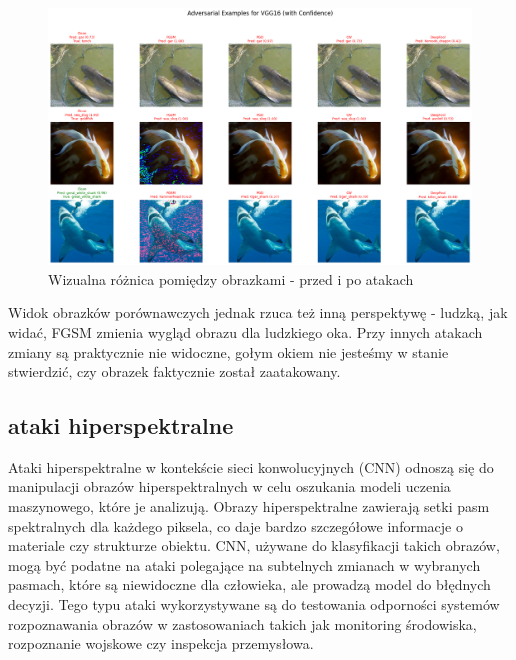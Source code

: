 \documentclass{article}
\begin{document}
\begin{figure} [H]
    \centering
    \includegraphics[width=1\textwidth]{adversarial_examples.png}
    \caption{Wizualna różnica pomiędzy obrazkami - przed i po atakach}
    \label{fig:enter-label}
\end{figure}

Widok obrazków porównawczych jednak rzuca też inną perspektywę - ludzką, jak widać, FGSM zmienia wygląd obrazu dla ludzkiego oka. Przy innych atakach zmiany są praktycznie nie widoczne, gołym okiem nie jesteśmy w stanie stwierdzić, czy obrazek faktycznie został zaatakowany. 
\subsection{ataki hiperspektralne}

Ataki hiperspektralne w kontekście sieci konwolucyjnych (CNN) odnoszą się do manipulacji obrazów hiperspektralnych w celu oszukania modeli uczenia maszynowego, które je analizują. Obrazy hiperspektralne zawierają setki pasm spektralnych dla każdego piksela, co daje bardzo szczegółowe informacje o materiale czy strukturze obiektu. CNN, używane do klasyfikacji takich obrazów, mogą być podatne na ataki polegające na subtelnych zmianach w wybranych pasmach, które są niewidoczne dla człowieka, ale prowadzą model do błędnych decyzji. Tego typu ataki wykorzystywane są do testowania odporności systemów rozpoznawania obrazów w zastosowaniach takich jak monitoring środowiska, rozpoznanie wojskowe czy inspekcja przemysłowa.
\end{document}
